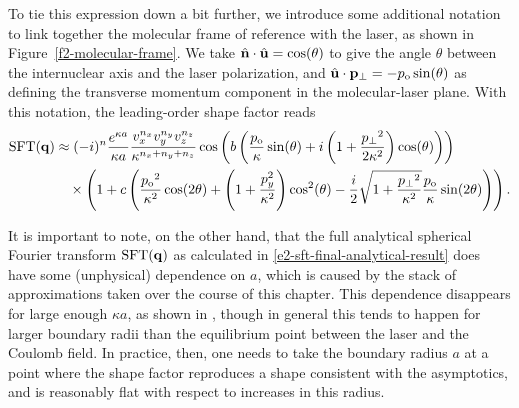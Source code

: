 To tie this expression down a bit further, we introduce some additional notation to link together the molecular frame of reference with the laser, as shown in Figure~\ref{f2-molecular-frame}. We take $\hat{\vb{n}}\cdot\hat{\vb{u}}=\cos(\theta)$ to give the angle $\theta$ between the internuclear axis and the laser polarization, and $\hat{\vb{u}}\cdot{\ensuremath{\vb{p}}_{\perp}}=-{p_\mathrm{o}}\sin(\theta)$ as defining the transverse momentum component in the molecular-laser plane. With this notation, the leading-order shape factor reads
\begin{align}
\sft(\vbq)
& \approx
(-i)^n
\frac{e^{ \kappa a }}{\kappa a}
\frac{ v_x^{n_x}v_y^{\smash[b]{n_y}} v_z^{n_z}}{\kappa^{n_x+n_y+n_z}}
\cos\left(
b \left(
   \frac{\po}{\kappa}\sin(\theta)
   +i \left(1+\frac{\pt^2}{2\kappa^2}\right)\cos(\theta)
 \right)
\right)
%
\nonumber\\ & \quad   \times 
%
\left( 
1 
+ c\left(
  \frac{\po^2}{\kappa^2}\cos(2\theta)
  +\left(1+\frac{p_y^2}{\kappa^2}\right)\cos^2(\theta)
  -\frac{i}{2} \sqrt{1+\frac{\pt^2}{\kappa^2}}\frac{\po}{\kappa}\sin(2\theta)
\right)
\right)
.
\label{e2-leading-asymptotic-sft-molecular}
\end{align}


It is important to note, on the other hand, that the full analytical spherical Fourier transform $\mathrm{SFT}(\vb{q})$ as calculated in \eqref{e2-sft-final-analytical-result} does have some (unphysical) dependence on $a$, which is caused by the stack of approximations taken over the course of this chapter. This dependence disappears for large enough $\kappa a$, as shown in , though in general this tends to happen for larger boundary radii than the equilibrium point between the laser and the Coulomb field. In practice, then, one needs to take the boundary radius $a$ at a point where the shape factor reproduces a shape consistent with the asymptotics, and is reasonably flat with respect to increases in this radius.



